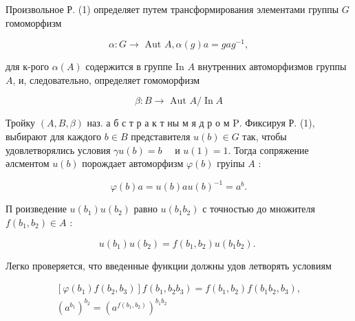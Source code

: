 \documentclass[10pt]{article}
\begin{document}
Произвольное Р. (1) определяет путем трансформирования элементами группы $G$ гомоморфизм



\[

\alpha: G \longrightarrow \text { Aut } A, \alpha(g) a=g a g^{-1},

\]



для к-рого $\alpha(A)$ содержится в группе In $A$ внутренних автоморфизмов группы $A$, и, следовательно, определяет гомоморфизм



\[

\beta: B \longrightarrow \text { Aut } A / \operatorname{In} A

\]



Тройку $(A, B, \beta)$ наз. а б с т р а к т ны м я д р о м $\mathrm{P}$. Фиксируя Р. (1), выбирают для каждого $b \in B$ представителя $u(b) \in G$ так, чтобы удовлетворялись условия $\gamma u(b)=b \quad$ и $u(1)=1$. Тогда сопряжение әлсментом $u(b)$ порождает автоморфизм $\varphi(b)$ груіпы $A$ :



\[

\varphi(b) a=u(b) a u(b)^{-1}=a^{b} .

\]



П роизведение $u\left(b_{1}\right) u\left(b_{2}\right)$ равно $u\left(b_{1} b_{2}\right)$ с точностью до множителя $f\left(b_{1}, b_{2}\right) \in A$ :



\[

u\left(b_{1}\right) u\left(b_{2}\right)=f\left(b_{1}, b_{2}\right) u\left(b_{1} b_{2}\right) \text {. }

\]



Легко проверяется, что введенные функции должны удов летворять условиям



\[

\begin{gathered}

{\left[\varphi\left(b_{1}\right) f\left(b_{2}, b_{3}\right)\right] f\left(b_{1}, b_{2} b_{3}\right)=f\left(b_{1}, b_{2}\right) f\left(b_{1} b_{2}, b_{3}\right),} \\

\left(a^{b_{1}}\right)^{b_{2}}=\left(a^{f\left(b_{1}, b_{2}\right)}\right)^{b_{1} b_{2}}

\end{gathered}

\]
\end{document}
